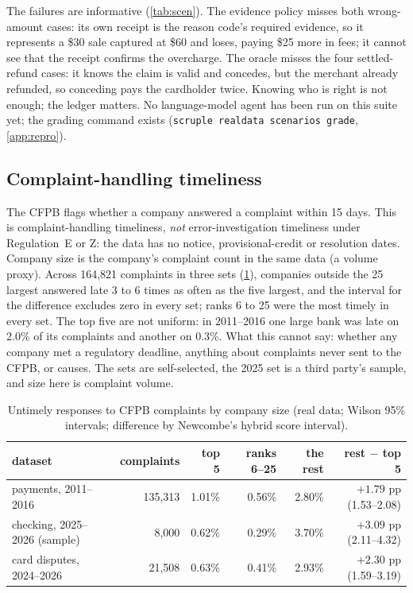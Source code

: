 \documentclass[11pt]{article}
\theoremstyle{definition}
\theoremstyle{remark}
\newcommand{\1}{\mathbf{1}}
\begin{document}
The failures are informative (\cref{tab:scen}). The evidence policy misses both wrong-amount cases: its own receipt is the reason code's required evidence, so it represents a \$30 sale captured at \$60 and loses, paying \$25 more in fees; it cannot see that the receipt confirms the overcharge. The oracle misses the four settled-refund cases: it knows the claim is valid and concedes, but the merchant already refunded, so conceding pays the cardholder twice. Knowing who is right is not enough; the ledger matters. No language-model agent has been run on this suite yet; the grading command exists (\texttt{scruple realdata scenarios grade}, \cref{app:repro}).

\subsection{Complaint-handling timeliness}

The CFPB flags whether a company answered a complaint within 15 days. This is complaint-handling timeliness, \emph{not} error-investigation timeliness under Regulation~E or Z: the data has no notice, provisional-credit or resolution dates. Company size is the company's complaint count in the same data (a volume proxy). Across 164{,}821 complaints in three sets (\cref{tab:time}), companies outside the 25 largest answered late 3 to 6 times as often as the five largest, and the interval for the difference excludes zero in every set; ranks 6 to 25 were the most timely in every set. The top five are not uniform: in 2011--2016 one large bank was late on 2.0\% of its complaints and another on 0.3\%. What this cannot say: whether any company met a regulatory deadline, anything about complaints never sent to the CFPB, or causes. The sets are self-selected, the 2025 set is a third party's sample, and size here is complaint volume.

\begin{table}[t]
\centering\footnotesize
\caption{Untimely responses to CFPB complaints by company size (real data; Wilson 95\% intervals; difference by Newcombe's hybrid score interval).}\label{tab:time}
\begin{tabular}{@{}lrrrrr@{}}
\toprule
dataset & complaints & top 5 & ranks 6--25 & the rest & rest $-$ top 5\\
\midrule
payments, 2011--2016 & 135{,}313 & 1.01\% & 0.56\% & 2.80\% & $+1.79$ pp (1.53--2.08)\\
checking, 2025--2026 (sample) & 8{,}000 & 0.62\% & 0.29\% & 3.70\% & $+3.09$ pp (2.11--4.32)\\
card disputes, 2024--2026 & 21{,}508 & 0.63\% & 0.41\% & 2.93\% & $+2.30$ pp (1.59--3.19)\\
\bottomrule
\end{tabular}
\end{table}
\end{document}
